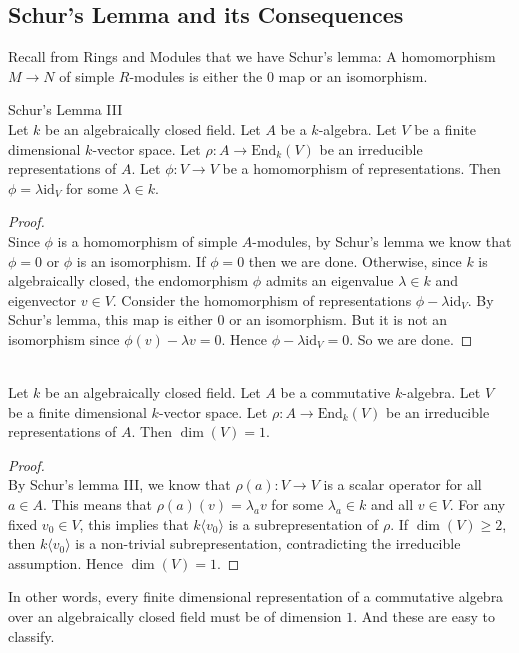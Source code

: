 \documentclass[a4paper]{article}
\begin{document}
\subsection{Schur's Lemma and its Consequences}
Recall from Rings and Modules that we have Schur's lemma: A homomorphism $M\to N$ of simple $R$-modules is either the $0$ map or an isomorphism. 

\begin{lmm}{Schur's Lemma III}{}\\
Let $k$ be an algebraically closed field. Let $A$ be a $k$-algebra. Let $V$ be a finite dimensional $k$-vector space. Let $\rho:A\to\text{End}_k(V)$ be an irreducible representations of $A$. Let $\phi:V\to V$ be a homomorphism of representations. Then $\phi=\lambda\text{id}_V$ for some $\lambda\in k$. 
\begin{proof}\\
Since $\phi$ is a homomorphism of simple $A$-modules, by Schur's lemma we know that $\phi=0$ or $\phi$ is an isomorphism. If $\phi=0$ then we are done. Otherwise, since $k$ is algebraically closed, the endomorphism $\phi$ admits an eigenvalue $\lambda\in k$ and eigenvector $v\in V$. Consider the homomorphism of representations $\phi-\lambda\text{id}_V$. By Schur's lemma, this map is either $0$ or an isomorphism. But it is not an isomorphism since $\phi(v)-\lambda v=0$. Hence $\phi-\lambda\text{id}_V=0$. So we are done. 
\end{proof}
\end{lmm}

\begin{crl}{}{}\\
Let $k$ be an algebraically closed field. Let $A$ be a commutative $k$-algebra. Let $V$ be a finite dimensional $k$-vector space. Let $\rho:A\to\text{End}_k(V)$ be an irreducible representations of $A$. Then $\dim(V)=1$. 
\begin{proof}\\
By Schur's lemma III, we know that $\rho(a):V\to V$ is a scalar operator for all $a\in A$. This means that $\rho(a)(v)=\lambda_av$ for some $\lambda_a\in k$ and all $v\in V$. For any fixed $v_0\in V$, this implies that $k\langle v_0\rangle$ is a subrepresentation of $\rho$. If $\dim(V)\geq 2$, then $k\langle v_0\rangle$ is a non-trivial subrepresentation, contradicting the irreducible assumption. Hence $\dim(V)=1$. 
\end{proof}	
\end{crl}

In other words, every finite dimensional representation of a commutative algebra over an algebraically closed field must be of dimension $1$. And these are easy to classify. 
\end{document}
